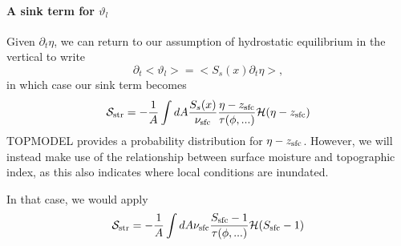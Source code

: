 \documentclass[twoside,10pt]{report}
\begin{document}
\paragraph{A sink term for $\vartheta_l$}
Given $\partial_t \eta$, we can return to our assumption of hydrostatic equilibrium in the vertical to write
\begin{equation}
\partial_t <\vartheta_l> = <S_s(x) \partial_t \eta>,
\end{equation}
in which case our sink term becomes
\begin{align}
    \mathcal{S_{\rm str}} &= -\frac{1}{A}\int dA \frac{S_s(x)}{\nu_{\rm sfc}}\frac{\eta - z_{\rm sfc}}{\tau(\phi,...)} \mathcal{H}(\eta - z_{\rm sfc}) \nonumber \\
\end{align}
TOPMODEL provides a probability distribution for $\eta-z_{\rm sfc}$. However, we will instead make use of the relationship between surface moisture and topographic index, as this also indicates where local conditions are inundated.

In that case, we would apply
\begin{align}
    \mathcal{S_{\rm str}} &= -\frac{1}{A}\int dA \nu_{\rm sfc}\frac{S_{\rm sfc}-1}{\tau(\phi,...)} \mathcal{H}(S_{\rm sfc} - 1) \nonumber \\
\end{align}
\end{document}
